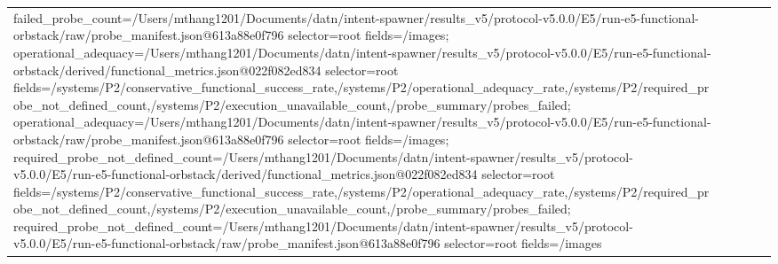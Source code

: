 \begin{tabular}{lllll}
failed\_probe\_count=/Users/mthang1201/Documents/datn/intent-spawner/results\_v5/protocol-v5.0.0/E5/run-e5-functional-orbstack/raw/probe\_manifest.json@613a88e0f796 selector=root fields=/images; operational\_adequacy=/Users/mthang1201/Documents/datn/intent-spawner/results\_v5/protocol-v5.0.0/E5/run-e5-functional-orbstack/derived/functional\_metrics.json@022f082ed834 selector=root fields=/systems/P2/conservative\_functional\_success\_rate,/systems/P2/operational\_adequacy\_rate,/systems/P2/required\_probe\_not\_defined\_count,/systems/P2/execution\_unavailable\_count,/probe\_summary/probes\_failed; operational\_adequacy=/Users/mthang1201/Documents/datn/intent-spawner/results\_v5/protocol-v5.0.0/E5/run-e5-functional-orbstack/raw/probe\_manifest.json@613a88e0f796 selector=root fields=/images; required\_probe\_not\_defined\_count=/Users/mthang1201/Documents/datn/intent-spawner/results\_v5/protocol-v5.0.0/E5/run-e5-functional-orbstack/derived/functional\_metrics.json@022f082ed834 selector=root fields=/systems/P2/conservative\_functional\_success\_rate,/systems/P2/operational\_adequacy\_rate,/systems/P2/required\_probe\_not\_defined\_count,/systems/P2/execution\_unavailable\_count,/probe\_summary/probes\_failed; required\_probe\_not\_defined\_count=/Users/mthang1201/Documents/datn/intent-spawner/results\_v5/protocol-v5.0.0/E5/run-e5-functional-orbstack/raw/probe\_manifest.json@613a88e0f796 selector=root fields=/images \\

\end{tabular}
